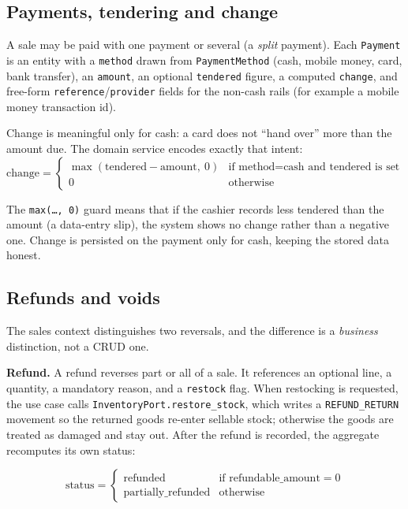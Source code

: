\documentclass[11pt,a4paper]{article}
\begin{document}
\subsection{Payments, tendering and change}

A sale may be paid with one payment or several (a \emph{split} payment). Each \texttt{Payment} is an
entity with a \texttt{method} drawn from \texttt{PaymentMethod} (cash, mobile money, card, bank
transfer), an \texttt{amount}, an optional \texttt{tendered} figure, a computed \texttt{change}, and
free-form \texttt{reference}/\texttt{provider} fields for the non-cash rails (for example a mobile
money transaction id).

Change is meaningful only for cash: a card does not ``hand over'' more than the amount due. The
domain service encodes exactly that intent:
\begin{equation}
\text{change} =
\begin{cases}
\max(\text{tendered} - \text{amount},\ 0) & \text{if method} = \text{cash and tendered is set}\\
0 & \text{otherwise}
\end{cases}
\end{equation}

The \texttt{max(\dots, 0)} guard means that if the cashier records less tendered than the amount (a
data-entry slip), the system shows no change rather than a negative one. Change is persisted on the
payment only for cash, keeping the stored data honest.

\subsection{Refunds and voids}

The sales context distinguishes two reversals, and the difference is a \emph{business} distinction,
not a CRUD one.

\textbf{Refund.} A refund reverses part or all of a sale. It references an optional line, a
quantity, a mandatory reason, and a \texttt{restock} flag. When restocking is requested, the use
case calls \texttt{InventoryPort.restore\_stock}, which writes a \texttt{REFUND\_RETURN} movement so
the returned goods re-enter sellable stock; otherwise the goods are treated as damaged and stay out.
After the refund is recorded, the aggregate recomputes its own status:

\[
\text{status} =
\begin{cases}
\text{refunded} & \text{if refundable\_amount} = 0\\
\text{partially\_refunded} & \text{otherwise}
\end{cases}
\]
\end{document}
